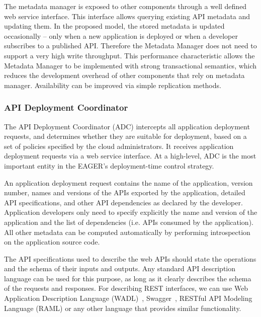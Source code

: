 The metadata manager is exposed to other components through a well defined web service interface.
This interface allows querying existing API metadata and updating them. In the proposed model, the stored metadata is updated 
occasionally -- only when a new application is deployed or when a developer subscribes to a published API. 
Therefore the Metadata Manager
does not need to support a very high write throughput. This performance
characteristic allows the Metadata Manager to be implemented with strong 
transactional semantics,
which reduces the development overhead of other components that rely on metadata manager. 
Availability can be improved via simple replication methods.

\subsubsection{API Deployment Coordinator} 
\label{sec:adc}
The API Deployment Coordinator (ADC)
intercepts all application deployment requests, and determines whether they are
suitable for deployment, based on a set of policies specified by the cloud
administrators. It receives application deployment requests via a web service
interface. At a high-level, ADC is the most important entity in the EAGER's deployment-time
control strategy.

An application deployment request contains the name of the application,
version number, names and versions of the APIs exported by the application,
detailed API specifications, and other API dependencies as declared by the
developer. Application developers only need to specify explicitly the name and
version of the application and the list of dependencies (i.e. APIs consumed by
the application). All other metadata can be computed automatically by
performing introspection on the application source code. 

The API specifications used to describe the web APIs should state the
operations and the schema of their inputs and outputs.  Any standard API
description language can be used for this purpose, as long as it clearly
describes the schema of the requests and responses. For describing REST
interfaces, we can use Web Application Description Language (WADL)~\cite{hl:wadl}, Swagger~\cite{hl:swagger},
RESTful API Modeling Language (RAML) or any other language that provides similar functionality. %

